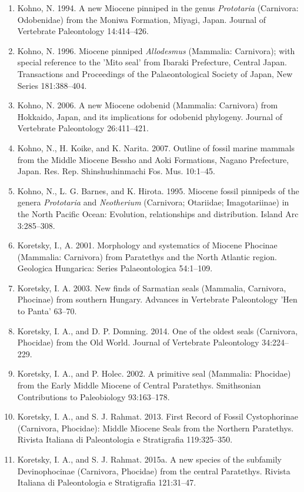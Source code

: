 \documentclass[a4paper, 12pt]{article}
\begin{document}
\begin{enumerate}
\item Kohno, N. 1994. A new Miocene pinniped in the genus \textit{Prototaria} (Carnivora: Odobenidae) from the Moniwa Formation, Miyagi, Japan. Journal of Vertebrate Paleontology 14:414–426.
\item Kohno, N. 1996. Miocene pinniped \textit{Allodesmus} (Mammalia: Carnivora); with special reference to the 'Mito seal' from Ibaraki Prefecture, Central Japan. Transactions and Proceedings of the Palaeontological Society of Japan, New Series 181:388–404.
\item Kohno, N. 2006. A new Miocene odobenid (Mammalia: Carnivora) from Hokkaido, Japan, and its implications for odobenid phylogeny. Journal of Vertebrate Paleontology 26:411–421.
\item Kohno, N., H. Koike, and K. Narita. 2007. Outline of fossil marine mammals from the Middle Miocene Bessho and Aoki Formations, Nagano Prefecture, Japan. Res. Rep. Shinshushinmachi Fos. Mus. 10:1–45.
\item Kohno, N., L. G. Barnes, and K. Hirota. 1995. Miocene fossil pinnipeds of the genera \textit{Prototaria} and \textit{Neotherium} (Carnivora; Otariidae; Imagotariinae) in the North Pacific Ocean: Evolution, relationships and distribution. Island Arc 3:285–308.
\item Koretsky, I., A. 2001. Morphology and systematics of Miocene Phocinae (Mammalia: Carnivora) from Paratethys and the North Atlantic region. Geologica Hungarica: Series Palaeontologica 54:1–109.
\item Koretsky, I. A. 2003. New finds of Sarmatian seals (Mammalia, Carnivora, Phocinae) from southern Hungary. Advances in Vertebrate Paleontology 'Hen to Panta' 63–70.
\item Koretsky, I. A., and D. P. Domning. 2014. One of the oldest seals (Carnivora, Phocidae) from the Old World. Journal of Vertebrate Paleontology 34:224–229.
\item Koretsky, I. A., and P. Holec. 2002. A primitive seal (Mammalia: Phocidae) from the Early Middle Miocene of Central Paratethys. Smithsonian Contributions to Paleobiology 93:163–178.
\item Koretsky, I. A., and S. J. Rahmat. 2013. First Record of Fossil Cystophorinae (Carnivora, Phocidae): Middle Miocene Seals from the Northern Paratethys. Rivista Italiana di Paleontologia e Stratigrafia 119:325–350.
\item Koretsky, I. A., and S. J. Rahmat. 2015a. A new species of the subfamily Devinophocinae (Carnivora, Phocidae) from the central Paratethys. Rivista Italiana di Paleontologia e Stratigrafia 121:31–47.

\end{enumerate}
\end{document}
